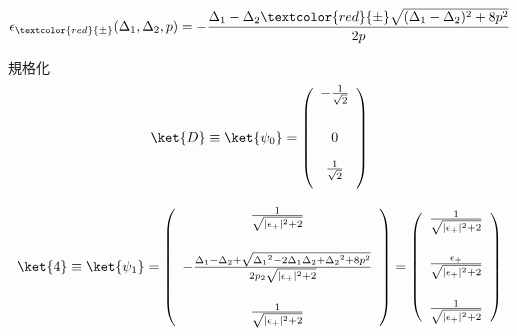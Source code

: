 \begin{align}
    \epsilon_{\textcolor{red}{\pm}}
    ({\Delta_{1}},{\Delta_{2}}, p)
    =-\frac{
    \Delta_{1}-\Delta_{2}
    {\textcolor{red}{\pm}}
    \sqrt{({\Delta_{1}}-{\Delta_{2}})^2+8{p^2}}
    }
    {2p}
\end{align}

規格化
\begin{equation}
        \ket{D}\equiv\ket{\psi_0}=\left(
        \begin{array}{c}
       -\frac{1}{\sqrt{2}}\\[20pt]
       0\\[10pt]
       \frac{1}{\sqrt{2}}\\[10pt]
        \end{array}
        \right)
\end{equation}

\begin{equation}
     \ket{4}\equiv\ket{\psi_1}=\left(
        \begin{array}{c}
       \frac{1}{\sqrt{
       |\epsilon_{+}|^2
       +2}}\\[20pt]
       -\frac{{\Delta_1}-{\Delta_2}+\sqrt{{\Delta_1}^2-2{\Delta_1}{\Delta_2}+{\Delta_2}^2+8p^2}}{2{p_2}\sqrt{
       |\epsilon_{+}|^2+2}}\\[20pt]
       \frac{1}{\sqrt{
       |\epsilon_{+}|^2+2}}
        \end{array}
        \right)
        =\left(
        \begin{array}{c}
       \frac{1}{\sqrt{
       |\epsilon_{+}|^2
       +2}}\\[20pt]
       \frac{\epsilon_+}{
       \sqrt{
       |\epsilon_{+}|^2
       +2}}\\[20pt]
       \frac{1}{\sqrt{
       |\epsilon_{+}|^2
       +2}}
        \end{array}
        \right)
\end{equation}

